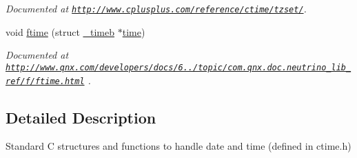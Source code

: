 \begin{DoxyCompactItemize}
\begin{DoxyCompactList}\small\item\em Documented at \href{http://www.cplusplus.com/reference/ctime/tzset/}{\tt http\-://www.\-cplusplus.\-com/reference/ctime/tzset/}. \end{DoxyCompactList}\item 
\hypertarget{group__time_gafc0d3a1676a915f3cedcad79759f6802}{void \hyperlink{group__time_gafc0d3a1676a915f3cedcad79759f6802}{ftime} (struct \hyperlink{struct__timeb}{\-\_\-timeb} $\ast$\hyperlink{group__time_ga8038cf2bfae47bdf6942741c58a2c530}{time})}\label{group__time_gafc0d3a1676a915f3cedcad79759f6802}

\begin{DoxyCompactList}\small\item\em Documented at \href{http://www.qnx.com/developers/docs/6.5.0/topic/com.qnx.doc.neutrino_lib_ref/f/ftime.html}{\tt http\-://www.\-qnx.\-com/developers/docs/6../topic/com.\-qnx.\-doc.\-neutrino\-\_\-lib\-\_\-ref/f/ftime.\-html} . \end{DoxyCompactList}\end{DoxyCompactItemize}


\subsection{Detailed Description}
Standard C structures and functions to handle date and time (defined in ctime.\-h) 